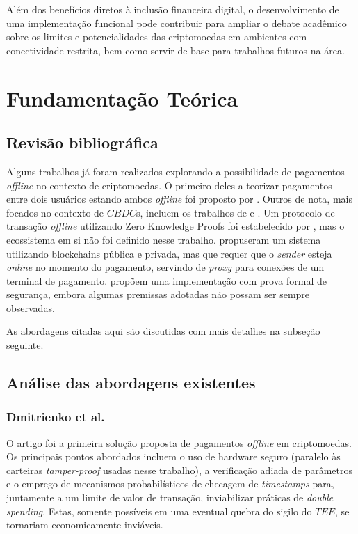 \documentclass[
  12pt,
  a4paper,
  oneside,
  article,
]{abntex2}
\begin{document}
Além dos benefícios diretos à inclusão financeira digital, o desenvolvimento de uma implementação funcional pode contribuir para ampliar o debate acadêmico sobre os limites e potencialidades das criptomoedas em ambientes com conectividade restrita, bem como servir de base para trabalhos futuros na área.

\section{Fundamentação Teórica}

\subsection{Revisão bibliográfica}

Alguns trabalhos já foram realizados explorando a possibilidade de pagamentos \textit{offline} no contexto de criptomoedas. O primeiro deles a teorizar pagamentos entre dois usuários estando ambos \textit{offline} foi proposto por \textcite{dmitrienko2017}. Outros de nota, mais focados no contexto de $CBDC$s, incluem os trabalhos de \textcite{videira2023} e \textcite{christodorescu2020}. Um protocolo de transação \textit{offline} utilizando Zero Knowledge Proofs foi estabelecido por \textcite{huayou2026}, mas o ecossistema em si não foi definido nesse trabalho. \textcite{ianov2021} propuseram um sistema utilizando blockchains pública e privada, mas que requer que o \textit{sender} esteja \textit{online} no momento do pagamento, servindo de \textit{proxy} para conexões de um terminal de pagamento. \textcite{jie2024} propõem uma implementação com prova formal de segurança, embora algumas premissas adotadas não possam ser sempre observadas.

As abordagens citadas aqui são discutidas com mais detalhes na subseção seguinte.

\subsection{Análise das abordagens existentes}

\subsubsection{Dmitrienko et al.}

O artigo foi a primeira solução proposta de pagamentos \textit{offline} em criptomoedas. Os principais pontos abordados incluem o uso de hardware seguro (paralelo às carteiras \textit{tamper-proof} usadas nesse trabalho), a verificação adiada de parâmetros e o emprego de mecanismos probabilísticos de checagem de \textit{\textit{timestamps}} para, juntamente a um limite de valor de transação, inviabilizar práticas de \textit{double spending}. Estas, somente possíveis em uma eventual quebra do sigilo do $TEE$, se tornariam economicamente inviáveis.
\end{document}
